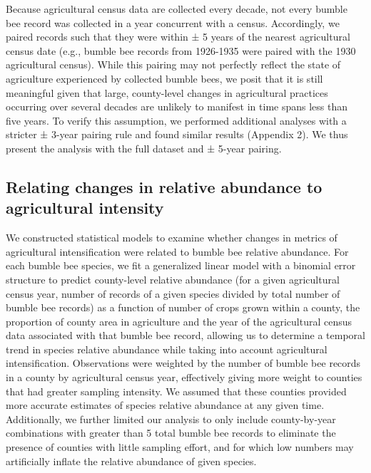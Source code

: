 \documentclass[11pt,]{article}
\begin{document}
Because agricultural census data are collected every decade, not every
bumble bee record was collected in a year concurrent with a census.
Accordingly, we paired records such that they were within ± 5 years of
the nearest agricultural census date (e.g., bumble bee records from
1926-1935 were paired with the 1930 agricultural census). While this
pairing may not perfectly reflect the state of agriculture experienced
by collected bumble bees, we posit that it is still meaningful given
that large, county-level changes in agricultural practices occurring
over several decades are unlikely to manifest in time spans less than
five years. To verify this assumption, we performed additional analyses
with a stricter ± 3-year pairing rule and found similar results
(Appendix 2). We thus present the analysis with the full dataset and ±
5-year pairing.

\hypertarget{relating-changes-in-relative-abundance-to-agricultural-intensity}{%
\subsection{Relating changes in relative abundance to agricultural
intensity}\label{relating-changes-in-relative-abundance-to-agricultural-intensity}}

We constructed statistical models to examine whether changes in metrics
of agricultural intensification were related to bumble bee relative
abundance. For each bumble bee species, we fit a generalized linear
model with a binomial error structure to predict county-level relative
abundance (for a given agricultural census year, number of records of a
given species divided by total number of bumble bee records) as a
function of number of crops grown within a county, the proportion of
county area in agriculture and the year of the agricultural census data
associated with that bumble bee record, allowing us to determine a
temporal trend in species relative abundance while taking into account
agricultural intensification. Observations were weighted by the number
of bumble bee records in a county by agricultural census year,
effectively giving more weight to counties that had greater sampling
intensity. We assumed that these counties provided more accurate
estimates of species relative abundance at any given time. Additionally,
we further limited our analysis to only include county-by-year
combinations with greater than 5 total bumble bee records to eliminate
the presence of counties with little sampling effort, and for which low
numbers may artificially inflate the relative abundance of given
species.
\end{document}
